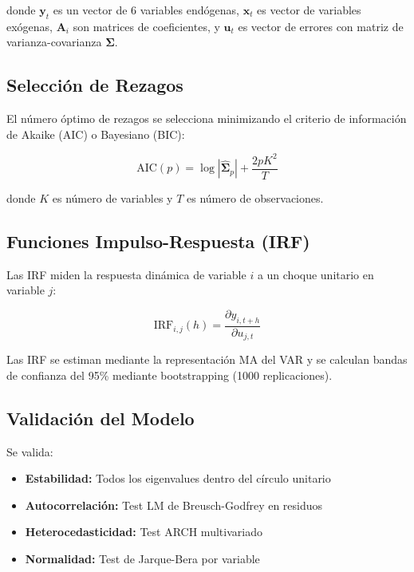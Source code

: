 \documentclass[12pt,a4paper]{article}
\begin{document}
donde $\mathbf{y}_t$ es un vector de 6 variables endógenas, $\mathbf{x}_t$ es vector de variables exógenas, $\mathbf{A}_i$ son matrices de coeficientes, y $\mathbf{u}_t$ es vector de errores con matriz de varianza-covarianza $\boldsymbol{\Sigma}$.

\subsection{Selección de Rezagos}

El número óptimo de rezagos se selecciona minimizando el criterio de información de Akaike (AIC) o Bayesiano (BIC):

\begin{equation}
\text{AIC}(p) = \log|\hat{\boldsymbol{\Sigma}}_p| + \frac{2pK^2}{T}
\end{equation}

donde $K$ es número de variables y $T$ es número de observaciones.

\subsection{Funciones Impulso-Respuesta (IRF)}

Las IRF miden la respuesta dinámica de variable $i$ a un choque unitario en variable $j$:

\begin{equation}
\text{IRF}_{i,j}(h) = \frac{\partial y_{i,t+h}}{\partial u_{j,t}}
\end{equation}

Las IRF se estiman mediante la representación MA del VAR y se calculan bandas de confianza del 95\% mediante bootstrapping (1000 replicaciones).

\subsection{Validación del Modelo}

Se valida:
\begin{itemize}
\item \textbf{Estabilidad:} Todos los eigenvalues dentro del círculo unitario
\item \textbf{Autocorrelación:} Test LM de Breusch-Godfrey en residuos
\item \textbf{Heterocedasticidad:} Test ARCH multivariado
\item \textbf{Normalidad:} Test de Jarque-Bera por variable
\end{itemize}
\end{document}
